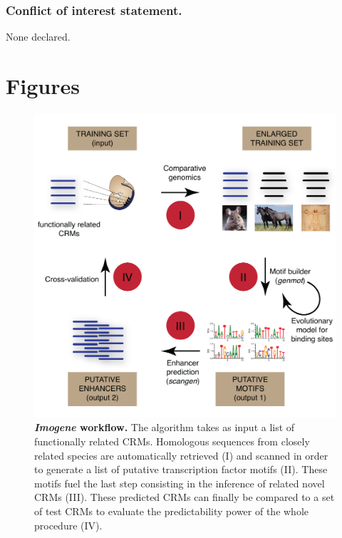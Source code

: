 \documentclass[a4,center,fleqn]{NAR}
\begin{document}
\subsubsection{Conflict of interest statement.} None declared.
\newpage

  
  
  
  \newpage
  \onecolumn
  \section*{Figures}



\begin{figure}[!htbp]
\begin{center}
\includegraphics[width=15cm]{figuresnar-sub/fig1.pdf}
\end{center}
\caption{\normalsize
{\bf {\em Imogene} workflow.}
    The algorithm takes as input a list of functionally related CRMs.
    Homologous sequences from closely related species are automatically
    retrieved (I) and scanned in order to generate a list of putative
    transcription factor motifs (II).
    These motifs fuel the last step consisting in the inference of related
    novel CRMs (III).
    These predicted CRMs can finally be compared to a set of test CRMs to
    evaluate the predictability power  of the whole procedure (IV). 
    }
    \label{fig:workflow}
\end{figure}
\end{document}
